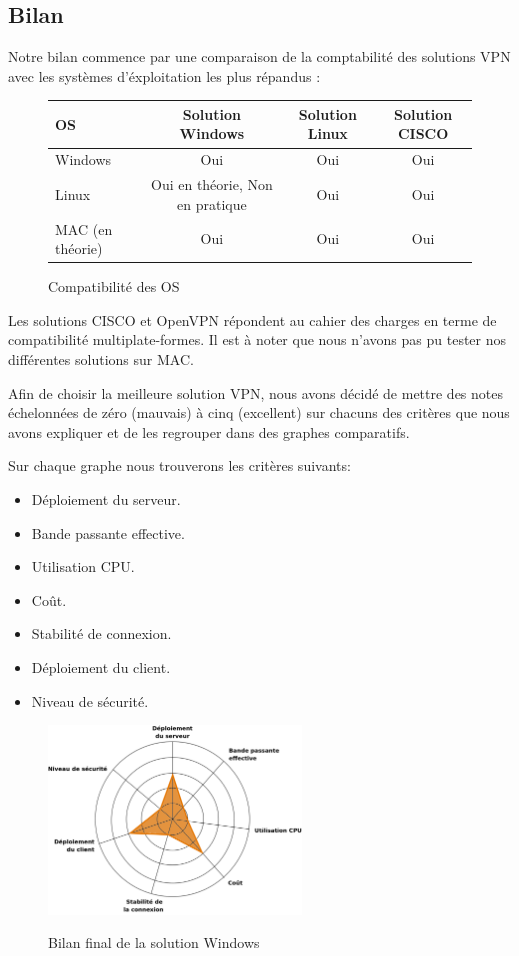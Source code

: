 \subsection{Bilan}

Notre bilan commence par une comparaison de la comptabilité des solutions VPN avec les systèmes d'éxploitation les plus répandus :

\begin{figure}[H]
	\begin{center}
\begin{tabular}{l|c|c|c}
OS & Solution Windows & Solution Linux & Solution CISCO \\
\hline
Windows & Oui & Oui & Oui \\
Linux & Oui en théorie, Non en pratique & Oui & Oui \\
MAC (en théorie) & Oui & Oui & Oui \\
\end{tabular}
	\end{center}
	\caption{Compatibilité des OS}
	\label{Compatibilité_des_OS}
\end{figure}

Les solutions CISCO et OpenVPN répondent au cahier des charges en terme de compatibilité multiplate-formes. Il est à noter que nous n'avons pas pu tester nos différentes solutions sur MAC.

Afin de choisir la meilleure solution VPN, nous avons décidé de mettre des notes échelonnées de zéro (mauvais) à cinq (excellent) sur chacuns des critères que nous avons expliquer et de les regrouper dans des graphes comparatifs.

Sur chaque graphe nous trouverons les critères suivants:
\begin{itemize}
 	\item Déploiement du serveur.
 	\item Bande passante effective.
 	\item Utilisation CPU.
 	\item Coût.
 	\item Stabilité de connexion.
 	\item Déploiement du client.
	\item Niveau de sécurité.
\end{itemize}

\begin{figure}[H]
	\begin{center}
		\includegraphics[width=0.6\textwidth]{partie_3/images/windows.png}\\
	\end{center}
	\caption{Bilan final de la solution Windows}
	\label{Graphe Windows}
\end{figure}

